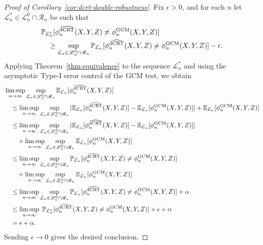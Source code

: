 \documentclass[aos]{imsart}
\theoremstyle{definition}
\theoremstyle{remark}
\newcommand{\E}{\mathbb E}								%
\renewcommand{\P}{\mathbb{P}}							%
\newcommand{\srx}{X}									%
\newcommand{\srz}{Z}									%
\newcommand{\sry}{Y}									%
\newcommand{\law}{\mathcal L}							%
\newcommand{\nulllaws}{\mathscr L^0}					%
\newcommand{\regclass}{\mathscr R}					    %
\newcommand{\GCM}{\textnormal{GCM}}						%
\newcommand{\dCRThat}{\widehat{\textnormal{dCRT}}}		%
\begin{document}
\begin{proof}[Proof of Corollary~\ref{cor:dcrt-double-robustness}] 
Fix $\epsilon > 0$, and for each $n$ let $\law^*_n \in \nulllaws_n \cap \regclass_n$ be such that
\begin{align*}
&\P_{\law^*_n}[\phi_n^{\dCRThat}(\srx, \sry, \srz) \neq \phi_n^{\GCM}(\srx, \sry, \srz)] \\
&\quad\geq \sup_{\law_n \in \nulllaws_n \cap \regclass_n} \P_{\law_n}[\phi_n^{\dCRThat}(\srx, \sry, \srz) \neq \phi_n^{\GCM}(\srx, \sry, \srz)] - \epsilon.
\end{align*}
Applying Theorem~\ref{thm:equivalence} to the sequence $\law^*_n$ and using the asymptotic Type-I error control of the GCM test, we obtain
\begin{equation*}
\begin{split}
&\limsup_{n \rightarrow \infty} \sup_{\law_n \in \nulllaws_n \cap \regclass_n} \E_{\law_n}[\phi_n^{\dCRThat}(\srx, \sry, \srz)] \\
&\quad\leq \limsup_{n \rightarrow \infty} \sup_{\law_n \in \nulllaws_n \cap \regclass_n} |\E_{\law_n}[\phi_n^{\dCRThat}(\srx, \sry, \srz)] - \E_{\law_n}[\phi_n^{\GCM}(\srx, \sry, \srz)]| + \E_{\law_n}[\phi_n^{\GCM}(\srx, \sry, \srz)] \\
&\quad\leq \limsup_{n \rightarrow \infty} \sup_{\law_n \in \nulllaws_n \cap  \regclass_n} |\E_{\law_n}[\phi_n^{\dCRThat}(\srx, \sry, \srz)] - \E_{\law_n}[\phi_n^{\GCM}(\srx, \sry, \srz)]| \\
&\quad \quad + \limsup_{n \rightarrow \infty} \sup_{\law_n \in \nulllaws_n \cap \regclass_n} \E_{\law_n}[\phi_n^{\GCM}(\srx, \sry, \srz)] \\
&\quad\leq \limsup_{n \rightarrow \infty} \sup_{\law_n \in \nulllaws_n \cap  \regclass_n} \P_{\law_n}[\phi_n^{\dCRThat}(\srx, \sry, \srz) \neq \phi_n^{\GCM}(\srx, \sry, \srz)]  \\
&\quad \quad + \limsup_{n \rightarrow \infty} \sup_{\law_n \in \nulllaws_n \cap \regclass_n} \E_{\law_n}[\phi_n^{\GCM}(\srx, \sry, \srz)] \\
&\quad\leq \limsup_{n \rightarrow \infty} \sup_{\law_n \in \nulllaws_n \cap  \regclass_n} \P_{\law_n}[\phi_n^{\dCRThat}(\srx, \sry, \srz) \neq \phi_n^{\GCM}(\srx, \sry, \srz)] + \alpha \\
&\quad\leq \limsup_{n \rightarrow \infty}\ \P_{\law^*_n}[\phi_n^{\dCRThat}(\srx, \sry, \srz) \neq \phi_n^{\GCM}(\srx, \sry, \srz)] + \epsilon +\alpha \\
&\quad=\epsilon + \alpha.
\end{split}
\end{equation*}
Sending $\epsilon \rightarrow 0$ gives the desired conclusion.
\end{proof}
\end{document}
